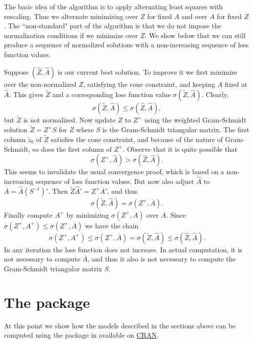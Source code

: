 \documentclass[article]{jss1}
\begin{document}
The basic idea of the algorithm is to apply alternating least squares with rescaling.
Thus we alternate minimizing over $Z$ for fixed $A$ and over $A$ for fixed $Z$.
The ``non-standard" part of the algorithm is that we do not impose the normalization
conditions if we minimize over $Z$. We show below that we can still produce a
sequence of normalized solutions with a non-increasing sequence of loss function
values.

Suppose $(\hat Z,\hat A)$ is our current best solution. To improve it we  first minimize over the non-normalized $Z$, satisfying the cone constraint, and keeping $A$ fixed at $\hat A$. This gives $\tilde Z$ and a corresponding loss function value $\sigma(\tilde Z,\hat A)$. Clearly,
\begin{equation}
\sigma(\tilde Z,\hat A)\leq\sigma(\hat Z,\hat A),
\end{equation}
but $\tilde Z$ is not normalized. Now update $Z$ to $Z^+$ using the weighted Gram-Schmidt solution $\tilde Z=Z^+S$ for $Z$ where $S$ is the Gram-Schmidt triangular matrix. The first column $\tilde z_0$ of $\tilde Z$ satisfies the cone constraint, and because of the nature of Gram-Schmidt, so does the first column of $Z^+$. Observe that it is quite possible that
\begin{equation}
\sigma(Z^+,\hat A)>\sigma(\hat Z,\hat A).
\end{equation}
This seems to invalidate the usual convergence proof, which is based on
a non-increasing sequence of loss function values. But now also adjust
$\hat A$ to $\overline A=\hat A(S^{-1})'$. Then $\tilde Z\hat A'=Z^+\overline A'$, and thus
\begin{equation}
\sigma(\tilde Z,\hat A)=\sigma(Z^+,\overline A).
\end{equation}
Finally compute $A^+$ by minimizing $\sigma(Z^+,A)$ over $A$. Since $\sigma(Z^+,A^+)\leq\sigma(Z^+,\overline A)$ 
we have the chain
\begin{equation}
\sigma(Z^+,A^+)\leq\sigma(Z^+,\overline A)=\sigma(\tilde Z,\hat A)\leq\sigma(\hat Z,\hat A).
\end{equation}
In any iteration the loss function does not increase. In actual computation, it is not necessary to compute 
$\overline A$, and thus it also is not necessary to compute the Gram-Schmidt triangular matrix $S$.

\section[The R package homals]{The  package }
\label{sec:R}
At this point we show how the models described in the sections above can be computed using the package  in  \citep{R:07} available on \href{http://cran.r-project.org}{CRAN}.
\end{document}
